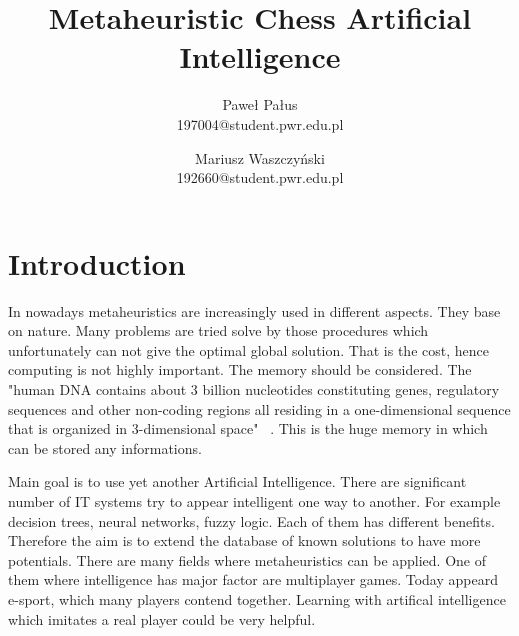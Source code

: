 \documentclass[pdftex]{article}
\date{}
\title{Metaheuristic Chess Artificial Intelligence}
\author{Paweł Pałus\\ 197004@student.pwr.edu.pl  \and Mariusz Waszczyński\\  192660@student.pwr.edu.pl }
\begin{document}
\thispagestyle{empty}

\section{Introduction}
\label{sec:introduction}

In nowadays metaheuristics are increasingly used in different aspects. They base on nature. Many problems are tried solve by those procedures which unfortunately can not give the optimal global solution. That is the cost, hence computing is not highly important. The memory should be considered. The "human DNA contains about 3 billion nucleotides constituting genes, regulatory sequences and other non-coding regions all residing in a one-dimensional sequence that is organized in 3-dimensional space" ~\cite{dna}. This is the huge memory in which can be stored any informations.

Main goal is to use yet another Artificial Intelligence. There are significant number of IT systems try to appear intelligent one way to another. For example decision trees, neural networks, fuzzy logic. Each of them has different benefits. Therefore the aim is to extend the database of known solutions to have more potentials. There are many fields where metaheuristics can be applied. One of them where intelligence has major factor are multiplayer games. Today appeard e-sport, which many players contend together. Learning with artifical intelligence which imitates a real player could be very helpful. 
\end{document}
